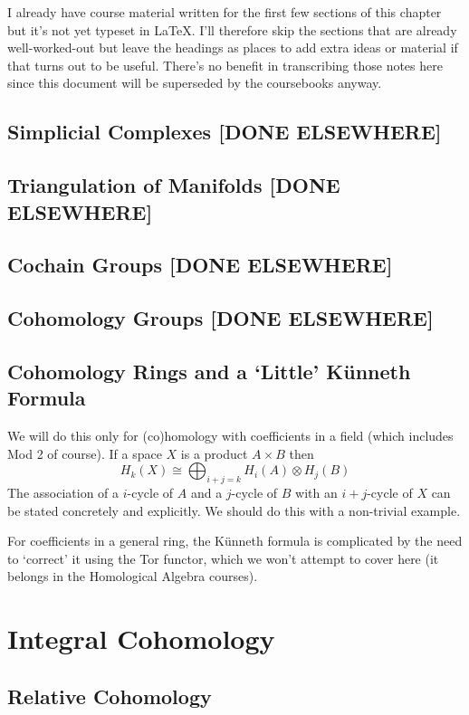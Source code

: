 \documentclass[oneside,english]{amsbook}
\numberwithin{section}{chapter}
\theoremstyle{plain}
\theoremstyle{definition}
\providecommand{\Kunneth}{K{\"u}nneth }
\begin{document}
	I already have course material written for the first few sections of this chapter but it's not yet typeset in \LaTeX. I'll therefore skip the sections that are already well-worked-out but leave the headings as places to add extra ideas or material if that turns out to be useful. There's no benefit in transcribing those notes here since this document will be superseded by the coursebooks anyway. 


	\section{Simplicial Complexes [DONE ELSEWHERE]}
	\section{Triangulation of Manifolds [DONE ELSEWHERE]}
	\section{Cochain Groups [DONE ELSEWHERE]}
	\section{Cohomology Groups [DONE ELSEWHERE]}
	\section{Cohomology Rings and a `Little' \Kunneth Formula}
	
	We will do this only for (co)homology with coefficients in a field (which includes Mod 2 of course). If a space $X$ is a product $A\times B$ then
	\[
		H_k (X) \cong \bigoplus_{i+j=k} H_i(A)\otimes H_j (B) 
 	\]
 	The association of a $i$-cycle of $A$ and a $j$-cycle of $B$ with an $i+j$-cycle of $X$ can be stated concretely and explicitly. We should do this with a non-trivial example.
 	
 	For coefficients in a general ring, the \Kunneth formula is complicated by the need to `correct' it using the Tor functor, which we won't attempt to cover here (it belongs in the Homological Algebra courses).

	\chapter{Integral Cohomology}
	\section{Relative Cohomology}
	
\end{document}
